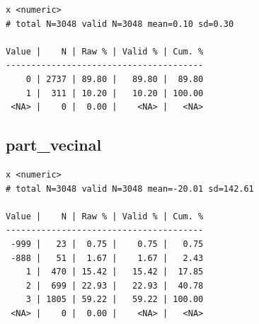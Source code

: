 \documentclass[
  letterpaper,
  DIV=11,
  numbers=noendperiod]{scrreprt}
\newenvironment{Shaded}{\begin{snugshade}}{\end{snugshade}}
\newcommand{\AttributeTok}[1]{\textcolor[rgb]{0.40,0.45,0.13}{#1}}
\newcommand{\DecValTok}[1]{\textcolor[rgb]{0.68,0.00,0.00}{#1}}
\newcommand{\FunctionTok}[1]{\textcolor[rgb]{0.28,0.35,0.67}{#1}}
\newcommand{\NormalTok}[1]{\textcolor[rgb]{0.00,0.23,0.31}{#1}}
\newcommand{\OtherTok}[1]{\textcolor[rgb]{0.00,0.23,0.31}{#1}}
\newcommand{\SpecialCharTok}[1]{\textcolor[rgb]{0.37,0.37,0.37}{#1}}
\newcommand{\StringTok}[1]{\textcolor[rgb]{0.13,0.47,0.30}{#1}}
\begin{document}
\begin{Shaded}
\end{Shaded}

\begin{verbatim}
x <numeric> 
# total N=3048 valid N=3048 mean=0.10 sd=0.30

Value |    N | Raw % | Valid % | Cum. %
---------------------------------------
    0 | 2737 | 89.80 |   89.80 |  89.80
    1 |  311 | 10.20 |   10.20 | 100.00
 <NA> |    0 |  0.00 |    <NA> |   <NA>
\end{verbatim}

\hypertarget{part_vecinal}{%
\subsection{part\_vecinal}\label{part_vecinal}}

\begin{Shaded}
\end{Shaded}

\begin{verbatim}
x <numeric> 
# total N=3048 valid N=3048 mean=-20.01 sd=142.61

Value |    N | Raw % | Valid % | Cum. %
---------------------------------------
 -999 |   23 |  0.75 |    0.75 |   0.75
 -888 |   51 |  1.67 |    1.67 |   2.43
    1 |  470 | 15.42 |   15.42 |  17.85
    2 |  699 | 22.93 |   22.93 |  40.78
    3 | 1805 | 59.22 |   59.22 | 100.00
 <NA> |    0 |  0.00 |    <NA> |   <NA>
\end{verbatim}
\end{document}
